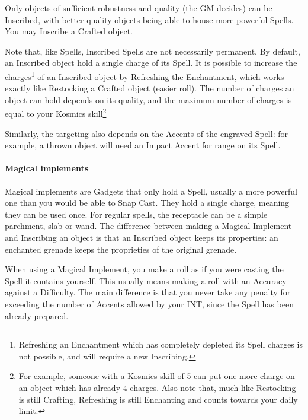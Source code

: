 Only objects of sufficient robustness and quality (the GM decides) can be Inscribed, with better quality objects being able to house more powerful Spells. You may Inscribe a Crafted object.

Note that, like Spells, Inscribed Spells are not necessarily permanent. By default, an Inscribed object hold a single charge of its Spell. It is possible to increase the charges\footnote{Refreshing an Enchantment which has completely depleted its Spell charges is not possible, and will require a new Inscribing.} of an Inscribed object by Refreshing the Enchantment, which works exactly like Restocking a Crafted object (easier roll). The number of charges an object can hold depends on its quality, and the maximum number of charges is equal to your Kosmics skill\footnote{For example, someone with a Kosmics skill of 5 can put one more charge on an object which has already 4 charges. Also note that, much like Restocking is still Crafting, Refreshing is still Enchanting and counts towards your daily limit.}

Similarly, the targeting also depends on the Accents of the engraved Spell: for example, a thrown object will need an Impact Accent for range on its Spell.

\paragraph{Magical implements}

Magical implements are Gadgets that only hold a Spell, usually a more powerful one than you would be able to Snap Cast. They hold a single charge, meaning they can be used once. For regular spells, the receptacle can be a simple parchment, slab or wand. The difference between making a Magical Implement and Inscribing an object is that an Inscribed object keeps its properties: an enchanted grenade keeps the proprieties of the original grenade.

When using a Magical Implement, you make a roll as if you were casting the Spell it contains yourself. This usually means making a roll with an Accuracy against a Difficulty. The main difference is that you never take any penalty for exceeding the number of Accents allowed by your INT, since the Spell has been already prepared.


